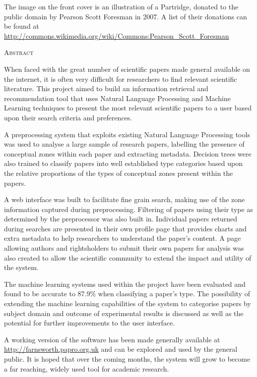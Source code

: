 \documentclass[11pt,a4paper,oneside]{book}
\begin{document}
The image on the front cover is an illustration of a Partridge, donated to the
public domain by Pearson Scott Foresman in 2007. A list of their donations can
be found at
\url{http://commons.wikimedia.org/wiki/Commons:Pearson_Scott_Foresman}

\pagebreak
\thispagestyle{plain}


\begin{center}
\textsc{\large Abstract}
\end{center}

When faced with the great number of scientific papers made general available on
the internet, it is often very difficult for researchers to find relevant
scientific literature. This project aimed to build an information retrieval and
recommendation tool that uses Natural Language Processing and Machine Learning
techniques to present the most relevant scientific papers to a user based upon
their search criteria and preferences.

A preprocessing system that exploits existing Natural Language Processing tools
was used to analyse a large sample of research papers, labelling the presence
of conceptual zones within each paper and extracting metadata.  Decision trees
were also trained to classify papers into well established type categories
based upon the relative proportions of the types of conceptual zones
present within the papers. 

A web interface was built to facilitate fine grain search, making use of the
zone information captured during preprocessing. Filtering of papers using their
type as determined by the preprocessor was also built in. Individual papers
returned during searches are presented in their own profile page that provides
charts and extra metadata to help researchers to understand the paper's
content. A page allowing authors and rightsholders to submit their own papers
for analysis was also created to allow the scientific community to extend the
impact and utility of the system.

The machine learning systems used within the project have been evaluated and
found to be accurate to 87.9\% when classifying a paper's type. The possibility
of extending the machine learning capabilities of the system to categorise
papers by subject domain and outcome of experimental results is discussed as
well as the potential for further improvements to the user interface.

A working version of the software has been made generally available at
\url{http://farnsworth.papro.org.uk} and can be explored and used by the
general public. It is hoped that over the coming months, the system will grow
to become a far reaching, widely used tool for academic research.
\end{document}
